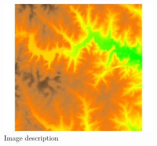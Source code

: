 \documentclass[10pt]{article}
\newcommand{\oneimgwidth}{0.7\textwidth}
\begin{document}
\begin{figure}[htbp]
  \centering
  \includegraphics[width=\oneimgwidth]{report_template_image}
  \caption{Image description}
  \label{fig:figure-internal-label}
\end{figure}
\end{document}
